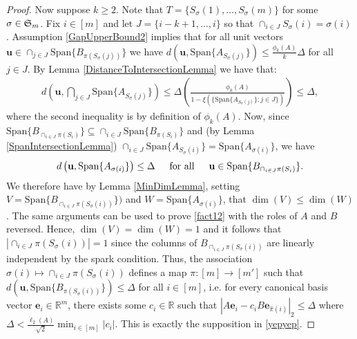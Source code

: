 \documentclass[journal, onecolumn]{IEEEtran}
\newtheorem{remark}{Remark}
\begin{document}
\begin{proof}
Now suppose $k \geq 2$. Note that $T = \{S_\sigma(1), \ldots, S_\sigma(m)\}$ for some $\sigma \in \frak{S}_m$. Fix $i \in [m]$ and let $J = \{i-k+1, \ldots, i\}$ so that $\cap_{i \in J} S_\sigma(i) = \sigma(i)$. Assumption \eqref{GapUpperBound2} implies that for all unit vectors $\mathbf{u} \in \cap_{j \in J} \text{Span}\{B_{\pi(S_\sigma(j))}\}$ we have $d(\mathbf{u}, \text{Span}\{A_{S_\sigma(j)}\}) \leq \frac{\phi_k(A)}{k} \Delta$ for all $j \in J$. By Lemma \ref{DistanceToIntersectionLemma} we have that:
\begin{align}\label{sym2}
d\left( \mathbf{u}, \bigcap_{j \in J} \text{Span}\{A_{S_{\sigma}(j)}\} \right) 
\leq \Delta \left( \frac{\phi_k(A)}{1 - \xi(\{ \text{Span}\{A_{S_{\sigma}(j)}\} : j \in J \})} \right) \leq \Delta,
\end{align}
%
where the second inequality is by definition of $\phi_k(A)$. Now, since $\text{Span}\{B_{\cap_{i \in J}\pi(S_i)}\} \subseteq \cap_{i \in J} \text{Span}\{B_{\pi(S_i)}\}$ and (by Lemma \ref{SpanIntersectionLemma}) $\cap_{i \in J}  \text{Span}\{A_{S_\sigma(i)}\} = \text{Span}\{A_{\sigma(i)}\}$, we have
\begin{align}\label{fact12}
d\left( \mathbf{u}, \text{Span}\{A_{\sigma(i)}\} \right) \leq \Delta \indent \text{for all} \indent \mathbf{u} \in \text{Span}\{B_{\cap_{i \in J}\pi(S_i)}\}.
\end{align}
We therefore have by Lemma \ref{MinDimLemma}, setting $V = \text{Span}\{B_{\cap_{i \in J}\pi(S_\sigma(i))}\})$ and $W = \text{Span}\{A_{\sigma(i)}\}$, that $\dim(V) \leq \dim(W)$. The same arguments can be used to prove \eqref{fact12} with the roles of $A$ and $B$ reversed. Hence, $\dim(V) = \dim(W) = 1$ and it follows that $|\cap_{i \in J} \pi(S_\sigma(i))| = 1$ since the columns of $B_{\cap_{i \in J} \pi(S_\sigma(i))}$ are linearly independent by the spark condition. Thus, the association $\sigma(i) \mapsto \cap_{i \in J} \pi(S_\sigma(i))$ defines a map $\pi: [m] \to [m']$ such that $d\left( \mathbf{u}, \text{Span}\{B_{ \pi(S_\sigma(i))}\}\right) \leq \Delta$ for all $i \in [m]$, i.e. for every canonical basis vector $\mathbf{e}_i \in \mathbb{R}^m$, there exists some $c_i \in \mathbb{R}$ such that $|A\mathbf{e}_i - c_iB\mathbf{e}_{\hat \pi(i)}|_2 \leq \Delta$ where $\Delta < \frac{\ell_{2}(A)}{\sqrt{2}} \min_{i \in [m]} |c_i|$. This is exactly the supposition in \eqref{yepyep}.
\end{proof}

\end{document}
